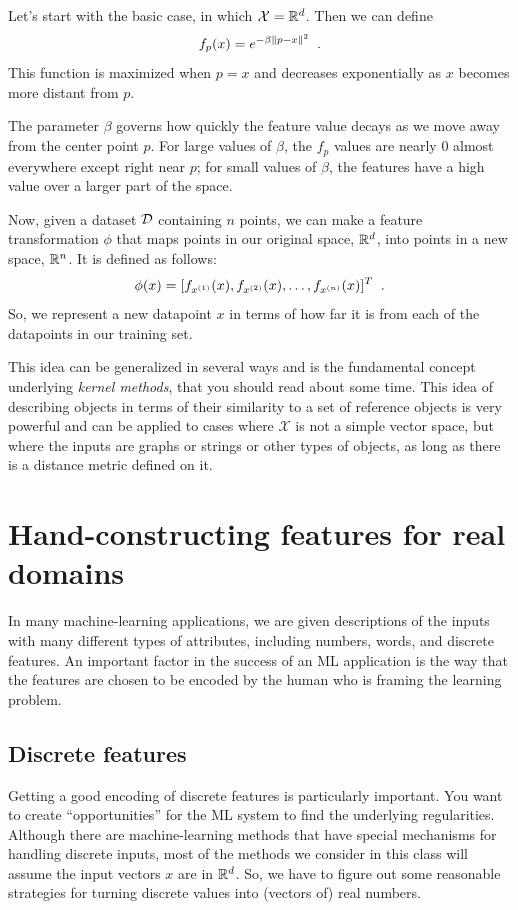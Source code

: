 Let's start with the basic case, in which $\mathcal{X} = \mathbb{R}^d$.  Then
we can define
\[f_p(x) = e^{-\beta\left\lVert p - x\right\rVert^2}\;\;.\]
This function is maximized when $p = x$ and decreases exponentially as
$x$ becomes more distant from $p$.

The parameter $\beta$ governs how
quickly the feature value decays as we move away from the center point
$p$.  For large values of $\beta$, the $f_p$ values are nearly 0
almost everywhere except right near $p$;  for small values of $\beta$,
the features have a high value over a larger part of the space.


Now, given a dataset ${\cal D}$ containing $n$ points, we can make a
feature transformation $\phi$ that maps points in our original
space, $\mathbb{R}^d$, into points in a new space, $\mathbb{R}^n$.  It is defined as
follows:
\[\phi(x) = [f_{x^{(1)}}(x), f_{x^{(2)}}(x), \ldots,
  f_{x^{(n)}}(x)]^T\;\;.\]
So, we represent a new datapoint $x$ in terms of how far it is from
each of the datapoints in our training set.

This idea can be generalized in several ways and is the fundamental
concept underlying {\em kernel methods}, that
you should read about some time. This idea of describing objects in
terms of their similarity to a set of reference objects is very
powerful and can be applied to cases where $\mathcal{X}$ is not a
simple vector space, but where the inputs are graphs or strings or
other types of objects, as long as there is a distance metric defined
on it.


\section{Hand-constructing features for real domains}

\label{handBuiltFeatures}
In many machine-learning applications, we are given descriptions of
the inputs with many different types of attributes, including numbers,
words, and discrete features.  An important factor in the success of
an ML application is the way that the features are chosen to be encoded
by the human who is framing the learning problem.

\subsection{Discrete features}
Getting a good encoding of discrete features is particularly
important.  You want to create ``opportunities'' for the ML system to
find the underlying regularities.  Although there are machine-learning
methods that have special mechanisms for handling discrete inputs,
most of
the methods we consider in this class will assume the input vectors
$x$ are in $\mathbb{R}^d$.  So, we have to figure out some reasonable
strategies for turning discrete values into (vectors of) real numbers.

